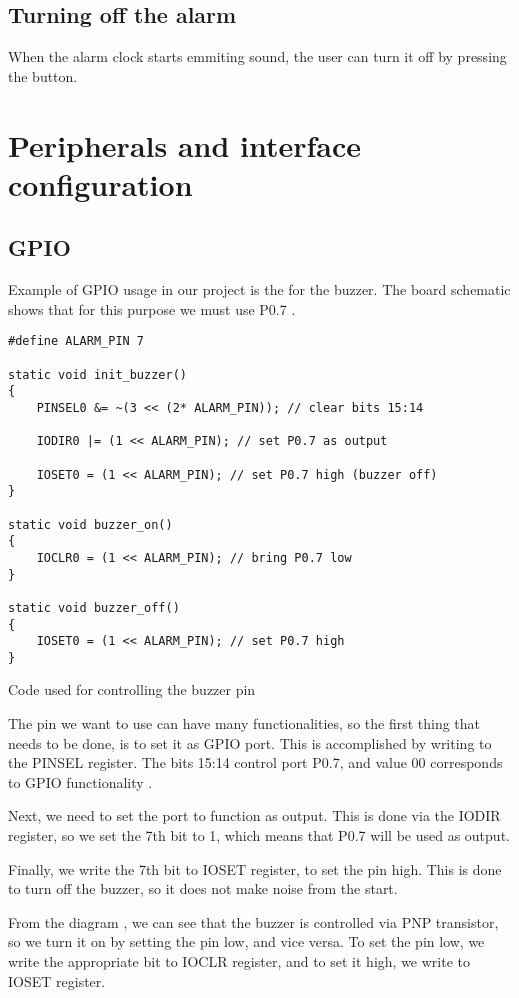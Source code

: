\documentclass[10pt]{article}
\begin{document}
\subsection{Turning off the alarm}
When the alarm clock starts emmiting sound, the user can turn it off by pressing the button.

\section{Peripherals and interface configuration}
    
\subsection{GPIO}
Example of GPIO usage in our project is the for the buzzer. 
The board schematic shows that for this purpose we must use P0.7 \mbox{\cite[p.9]{eduboard-man}}.

\begin{program}
	\begin{lstlisting}
#define ALARM_PIN 7

static void init_buzzer()
{
    PINSEL0 &= ~(3 << (2* ALARM_PIN)); // clear bits 15:14

    IODIR0 |= (1 << ALARM_PIN); // set P0.7 as output

    IOSET0 = (1 << ALARM_PIN); // set P0.7 high (buzzer off)
}

static void buzzer_on()
{
    IOCLR0 = (1 << ALARM_PIN); // bring P0.7 low
}

static void buzzer_off()
{
    IOSET0 = (1 << ALARM_PIN); // set P0.7 high
}
	\end{lstlisting}
	\caption{Code used for controlling the buzzer pin}
\end{program}

The pin we want to use can have many functionalities, so the first thing that needs to be done, is to set it as GPIO port.
This is accomplished by writing to the PINSEL register. The bits 15:14 control port P0.7, and value 00 corresponds to GPIO functionality \cite[p.59]{lpc2148-manual}.
    
Next, we need to set the port to function as output. This is done via the IODIR register, so we set the 7th bit to 1, which means that P0.7 will be used as output.

Finally, we write the 7th bit to IOSET register, to set the pin high. 
This is done to turn off the buzzer, so it does not make noise from the start.

From the diagram \cite[p.9]{eduboard-man}, we can see that the buzzer is controlled via PNP transistor, so we turn it on by setting the pin low, and vice versa.
To set the pin low, we write the appropriate bit to IOCLR register, and to set it high, we write to IOSET register.
\end{document}
